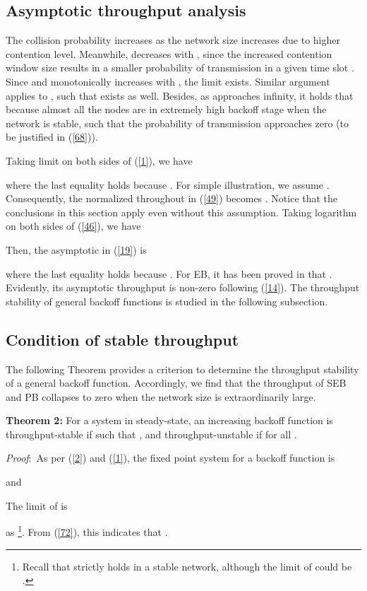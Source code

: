 \documentclass[journal]{IEEEtran}
\begin{document}
\subsection{Asymptotic throughput analysis}
The collision probability  increases as the network size  increases due to higher contention level. Meanwhile,  decreases with , since the increased contention window size results in a smaller probability of transmission in a given time slot \cite{2005:Kwok}. Since  and monotonically increases with , the limit  exists. Similar argument applies to , such that  exists as well. Besides, as  approaches infinity, it holds that  because almost all the nodes are in extremely high backoff stage when the network is stable, such that the probability of transmission approaches zero (to be justified in (\ref{68})).

Taking limit on both sides of (\ref{1}), we have

where the last equality holds because . For simple illustration, we assume . Consequently, the normalized throughout in (\ref{49}) becomes . Notice that the conclusions in this section apply even without this assumption. Taking logarithm on both sides of (\ref{46}), we have

Then, the asymptotic  in (\ref{19}) is

where the last equality holds because . For EB, it has been proved in \cite{2007:Kumar} that . Evidently, its asymptotic throughput is non-zero following (\ref{14}). The throughput stability of general backoff functions is studied in the following subsection.

\subsection{Condition of stable throughput}
The following Theorem  provides a criterion to determine the throughput stability of a general backoff function. Accordingly, we find that the throughput of SEB and PB collapses to zero when the network size is extraordinarily large.

\textbf{Theorem 2:} For a system in steady-state, an increasing backoff function  is throughput-stable if  such that , and throughput-unstable if   for all .

\emph{Proof}:\ As per (\ref{2}) and (\ref{1}), the fixed point system for a backoff function  is

and

The limit of  is

as  \footnote{Recall that  strictly holds in a stable network, although the limit of  could be .}. From (\ref{72}), this indicates that .
\end{document}
